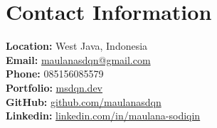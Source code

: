 \section*{Contact Information}
\textbf{Location:} West Java, Indonesia\\
\textbf{Email:} \href{mailto:maulanasdqn@gmail.com}{maulanasdqn@gmail.com} \\
\textbf{Phone:} 085156085579 \\
\textbf{Portfolio:} \href{https://msdqn.dev}{msdqn.dev} \\
\textbf{GitHub:} \href{https://github.com/maulanasdqn}{github.com/maulanasdqn} \\
\textbf{Linkedin:} \href{https://linkedin.com/in/maulana-sodiqin}{linkedin.com/in/maulana-sodiqin}

